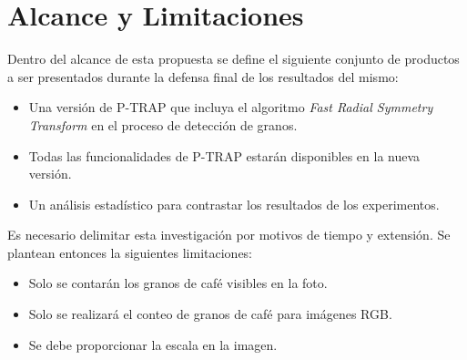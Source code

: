\section{\textbf{Alcance y Limitaciones}}
Dentro del alcance de esta propuesta se define el siguiente conjunto de productos a ser presentados durante la defensa final de los resultados del mismo:
\begin{itemize}
\item Una versi\'on de P-TRAP que incluya el algoritmo \textit{Fast Radial Symmetry Transform} en el proceso de detecci\'on de granos.
\item Todas las funcionalidades de P-TRAP estar\'an disponibles en la nueva versi\'on.
\item Un an\'alisis estad\'istico para contrastar los resultados de los experimentos.\\
\end{itemize}
Es necesario delimitar esta investigaci\'on por motivos de tiempo y extensi\'on. Se plantean entonces la siguientes limitaciones:
\begin{itemize}
\item Solo se contar\'an los granos de caf\'e visibles en la foto. 
\item Solo se realizar\'a el conteo de granos de caf\'e para im\'agenes RGB.
\item Se debe proporcionar la escala en la imagen.
\end{itemize}